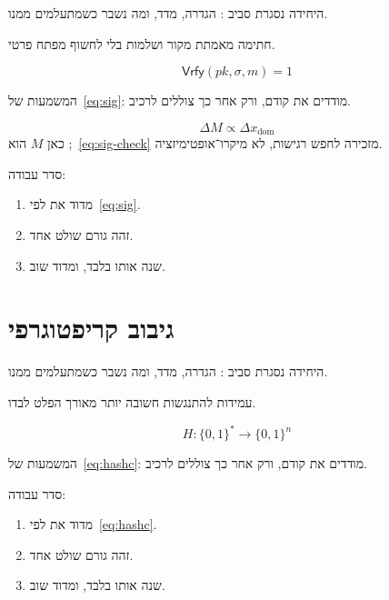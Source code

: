 היחידה נסגרת סביב : הגדרה, מדד, ומה נשבר כשמתעלמים ממנו.

\begin{defbox}[frametitle={הגדרה — חתימות}]
חתימה מאמתת מקור ושלמות בלי לחשוף מפתח פרטי.
\end{defbox}

\begin{equation}
\label{eq:sig}
\mathsf{Vrfy}(pk,\sigma,m)=1
\end{equation}

המשמעות של~\eqref{eq:sig}: מודדים את  קודם, ורק אחר כך צוללים לרכיב.

\begin{equation}
\label{eq:sig-check}
\Delta M \propto \Delta x_{\mathrm{dom}}
\end{equation}
כאן $M$ הוא ;~\eqref{eq:sig-check} מזכירה לחפש רגישות, לא מיקרו־אופטימיזציה.

סדר עבודה:
\begin{enumerate}
\item[(\textbf{א})] מדוד את  לפי~\eqref{eq:sig}.
\item[(\textbf{ב})] זהה גורם שולט אחד.
\item[(\textbf{ג})] שנה אותו בלבד, ומדוד שוב.
\end{enumerate}

\chapter{גיבוב קריפטוגרפי}
\label{ch:hashc}

היחידה נסגרת סביב : הגדרה, מדד, ומה נשבר כשמתעלמים ממנו.

\begin{keybox}[frametitle={רעיון מפתח — גיבוב קריפטוגרפי}]
עמידות להתנגשות חשובה יותר מאורך הפלט לבדו.
\end{keybox}

\begin{equation}
\label{eq:hashc}
H:\{0,1\}^*\to\{0,1\}^n
\end{equation}

המשמעות של~\eqref{eq:hashc}: מודדים את  קודם, ורק אחר כך צוללים לרכיב.

סדר עבודה:
\begin{enumerate}
\item[(\textbf{א})] מדוד את  לפי~\eqref{eq:hashc}.
\item[(\textbf{ב})] זהה גורם שולט אחד.
\item[(\textbf{ג})] שנה אותו בלבד, ומדוד שוב.
\end{enumerate}

